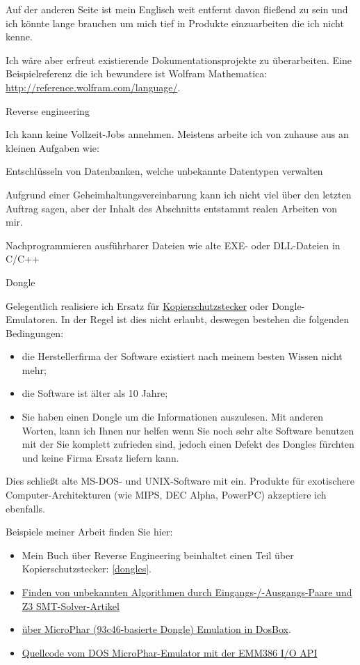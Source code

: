 Auf der anderen Seite ist mein Englisch weit entfernt davon fließend zu sein und
ich könnte lange brauchen um mich tief in Produkte einzuarbeiten die ich nicht kenne.

Ich wäre aber erfreut existierende Dokumentationsprojekte zu überarbeiten.
Eine Beispielreferenz die ich bewundere ist Wolfram Mathematica: \url{http://reference.wolfram.com/language/}.
\fi

\Large Reverse engineering \normalsize

Ich kann keine Vollzeit-Jobs annehmen. Meistens arbeite ich von zuhause aus an kleinen Aufgaben wie:

\large Entschlüsseln von Datenbanken, welche unbekannte Datentypen verwalten \normalsize

Aufgrund einer Geheimhaltungsvereinbarung kann ich nicht viel über den letzten Auftrag
sagen, aber der Inhalt des Abschnitts  entstammt realen Arbeiten von mir.

\large Nachprogrammieren ausführbarer Dateien wie alte EXE- oder DLL-Dateien in C/C++ \normalsize

\large Dongle \normalsize

Gelegentlich realisiere ich Ersatz für
\href{https://en.wikipedia.org/wiki/Software_protection_dongle}{Kopierschutzstecker} oder Dongle-Emulatoren.
In der Regel ist dies nicht erlaubt, deswegen bestehen die folgenden Bedingungen:

\begin{itemize}
\item die Herstellerfirma der Software existiert nach meinem besten Wissen nicht mehr;
\item die Software ist älter als 10 Jahre;
\item Sie haben einen Dongle um die Informationen auszulesen. Mit anderen Worten, kann ich Ihnen
nur helfen wenn Sie noch sehr alte Software benutzen mit der Sie komplett zufrieden sind, jedoch
einen Defekt des Dongles fürchten und keine Firma Ersatz liefern kann. 
\end{itemize}

Dies schließt alte MS-DOS- und UNIX-Software mit ein. Produkte für exotischere Computer-Architekturen
(wie MIPS, DEC Alpha, PowerPC) akzeptiere ich ebenfalls.

Beispiele meiner Arbeit finden Sie hier:

\begin{itemize}
\item Mein Buch über Reverse Engineering beinhaltet einen Teil über Kopierschutzstecker: \ref{dongles}.
\item \href{http://yurichev.com/writings/z3_rockey.pdf}{Finden von unbekannten Algorithmen durch Eingangs-/-Ausgangs-Paare
und Z3 SMT-Solver-Artikel}
\item \href{http://yurichev.com/blog/56/}{über MicroPhar (93c46-basierte Dongle) Emulation in DosBox}.
\item \href{http://conus.info/dongle/src/microph.asm}{Quellcode vom DOS MicroPhar-Emulator mit der EMM386 I/O API}
\end{itemize}


